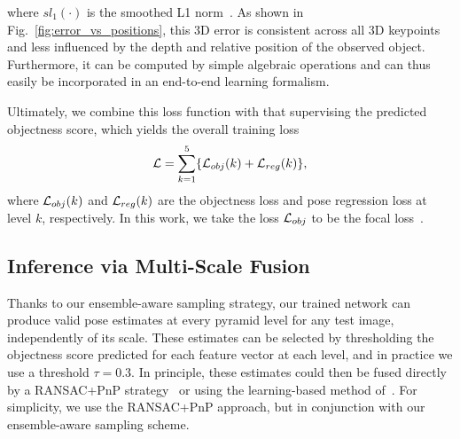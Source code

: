 %
where $sl_1(\cdot)$ is the smoothed L1 norm~\cite{Girshick15}. As shown in Fig.~\ref{fig:error_vs_positions},
this 3D error is consistent across all 3D keypoints and less influenced by the depth and relative position of the observed object. 
Furthermore, it can be computed by simple algebraic operations and can thus easily be incorporated in an end-to-end learning formalism.

Ultimately, we combine this loss function with that supervising the predicted objectness score, which yields the overall training loss
\begin{equation}
    {\cal L} = \sum_{k=1}^{5}\{{\cal L}_{obj}(k) + {\cal L}_{reg}(k)\},
\end{equation}
where ${\cal L}_{obj}(k)$ and ${\cal L}_{reg}(k)$ are the objectness loss and pose regression loss at level $k$, respectively. In this work, we take the loss ${\cal L}_{obj}$ to be the focal loss~\cite{Lin17f}.

\subsection{Inference via Multi-Scale Fusion}

Thanks to our ensemble-aware sampling strategy, our trained network can produce valid pose estimates at every pyramid level for any test image, independently of its scale. These estimates can be selected by thresholding the objectness score predicted for each feature vector at each level, and in practice we use a threshold $\tau = 0.3$. In principle, these estimates could then be fused directly by a RANSAC+PnP strategy~\cite{Lepetit09} or using the learning-based method of~\cite{Hu20a}. 
For simplicity, we use the RANSAC+PnP approach, but in conjunction with our ensemble-aware sampling scheme.

